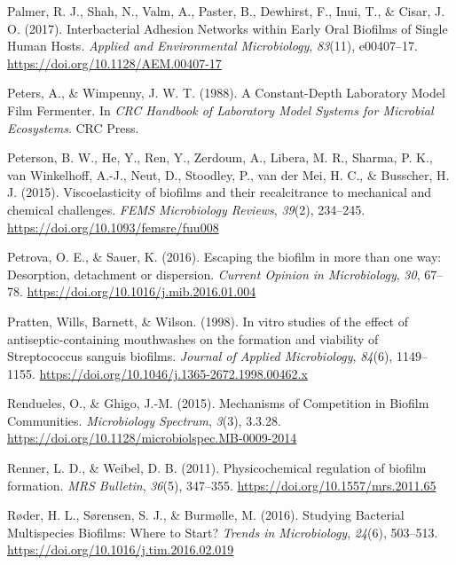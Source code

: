 \documentclass[
  letterpaper,
]{book}
\newlength{\cslhangindent}
\newlength{\cslentryspacingunit} %
\newenvironment{CSLReferences}[2] %
 {%
  \setlength{\parindent}{0pt}
  \ifodd #1
  \let\oldpar\par
  \def\par{\hangindent=\cslhangindent\oldpar}
  \fi
  \setlength{\parskip}{#2\cslentryspacingunit}
 }%
 {}
\begin{document}
\begin{CSLReferences}{1}{0}
\leavevmode{}%
Palmer, R. J., Shah, N., Valm, A., Paster, B., Dewhirst, F., Inui, T.,
\& Cisar, J. O. (2017). Interbacterial {Adhesion Networks} within {Early
Oral Biofilms} of {Single Human Hosts}. \emph{Applied and Environmental
Microbiology}, \emph{83}(11), e00407--17.
\url{https://doi.org/10.1128/AEM.00407-17}

\leavevmode{}%
Peters, A., \& Wimpenny, J. W. T. (1988). A {Constant-Depth Laboratory
Model Film Fermenter}. In \emph{{CRC Handbook} of {Laboratory Model
Systems} for {Microbial Ecosystems}}. {CRC Press}.

\leavevmode{}%
Peterson, B. W., He, Y., Ren, Y., Zerdoum, A., Libera, M. R., Sharma, P.
K., van Winkelhoff, A.-J., Neut, D., Stoodley, P., van der Mei, H. C.,
\& Busscher, H. J. (2015). Viscoelasticity of biofilms and their
recalcitrance to mechanical and chemical challenges. \emph{FEMS
Microbiology Reviews}, \emph{39}(2), 234--245.
\url{https://doi.org/10.1093/femsre/fuu008}

\leavevmode{}%
Petrova, O. E., \& Sauer, K. (2016). Escaping the biofilm in more than
one way: Desorption, detachment or dispersion. \emph{Current Opinion in
Microbiology}, \emph{30}, 67--78.
\url{https://doi.org/10.1016/j.mib.2016.01.004}

\leavevmode{}%
Pratten, Wills, Barnett, \& Wilson. (1998). In vitro studies of the
effect of antiseptic-containing mouthwashes on the formation and
viability of {Streptococcus} sanguis biofilms. \emph{Journal of Applied
Microbiology}, \emph{84}(6), 1149--1155.
\url{https://doi.org/10.1046/j.1365-2672.1998.00462.x}

\leavevmode{}%
Rendueles, O., \& Ghigo, J.-M. (2015). Mechanisms of {Competition} in
{Biofilm Communities}. \emph{Microbiology Spectrum}, \emph{3}(3),
3.3.28. \url{https://doi.org/10.1128/microbiolspec.MB-0009-2014}

\leavevmode{}%
Renner, L. D., \& Weibel, D. B. (2011). Physicochemical regulation of
biofilm formation. \emph{MRS Bulletin}, \emph{36}(5), 347--355.
\url{https://doi.org/10.1557/mrs.2011.65}

\leavevmode{}%
Røder, H. L., Sørensen, S. J., \& Burmølle, M. (2016). Studying
{Bacterial Multispecies Biofilms}: {Where} to {Start}? \emph{Trends in
Microbiology}, \emph{24}(6), 503--513.
\url{https://doi.org/10.1016/j.tim.2016.02.019}


\end{CSLReferences}
\end{document}
